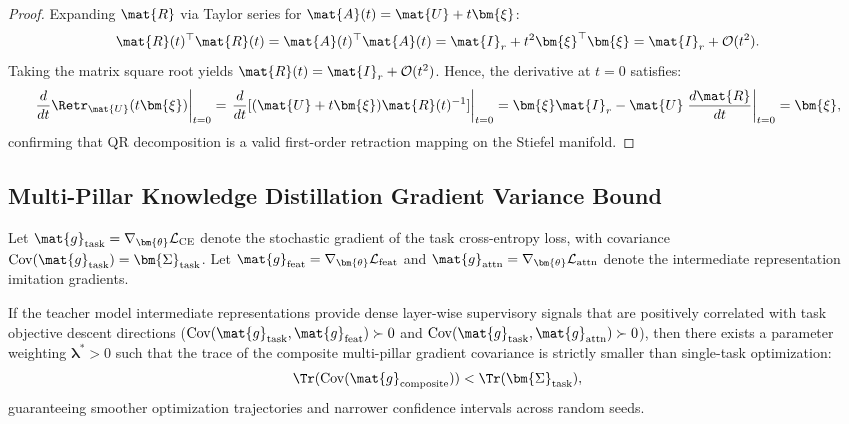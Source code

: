 \begin{proof}
Expanding $\mat{R}$ via Taylor series for $\mat{A}(t) = \mat{U} + t \bm{\xi}$:
\begin{equation}
\mat{R}(t)^\top \mat{R}(t) = \mat{A}(t)^\top \mat{A}(t) = \mat{I}_r + t^2 \bm{\xi}^\top \bm{\xi} = \mat{I}_r + \mathcal{O}(t^2).
\end{equation}
Taking the matrix square root yields $\mat{R}(t) = \mat{I}_r + \mathcal{O}(t^2)$. Hence, the derivative at $t=0$ satisfies:
\begin{equation}
\left.\frac{d}{dt} \Retr_{\mat{U}}(t \bm{\xi})\right|_{t=0} = \left.\frac{d}{dt} [(\mat{U} + t \bm{\xi}) \mat{R}(t)^{-1}]\right|_{t=0} = \bm{\xi} \mat{I}_r - \mat{U} \left.\frac{d \mat{R}}{dt}\right|_{t=0} = \bm{\xi},
\end{equation}
confirming that QR decomposition is a valid first-order retraction mapping on the Stiefel manifold.
\end{proof}

\subsection{Multi-Pillar Knowledge Distillation Gradient Variance Bound}
\label{sec:proof_kd_variance}

\begin{proposition}
Let $\mat{g}_{\text{task}} = \nabla_{\bm{\theta}} \mathcal{L}_{\text{CE}}$ denote the stochastic gradient of the task cross-entropy loss, with covariance $\operatorname{Cov}(\mat{g}_{\text{task}}) = \bm{\Sigma}_{\text{task}}$. Let $\mat{g}_{\text{feat}} = \nabla_{\bm{\theta}} \mathcal{L}_{\text{feat}}$ and $\mat{g}_{\text{attn}} = \nabla_{\bm{\theta}} \mathcal{L}_{\text{attn}}$ denote the intermediate representation imitation gradients. 

If the teacher model intermediate representations provide dense layer-wise supervisory signals that are positively correlated with task objective descent directions ($\operatorname{Cov}(\mat{g}_{\text{task}}, \mat{g}_{\text{feat}}) \succ 0$ and $\operatorname{Cov}(\mat{g}_{\text{task}}, \mat{g}_{\text{attn}}) \succ 0$), then there exists a parameter weighting $\bm{\lambda}^* > 0$ such that the trace of the composite multi-pillar gradient covariance is strictly smaller than single-task optimization:
\begin{equation}
\Tr(\operatorname{Cov}(\mat{g}_{\text{composite}})) < \Tr(\bm{\Sigma}_{\text{task}}),
\end{equation}
guaranteeing smoother optimization trajectories and narrower confidence intervals across random seeds.
\end{proposition}

